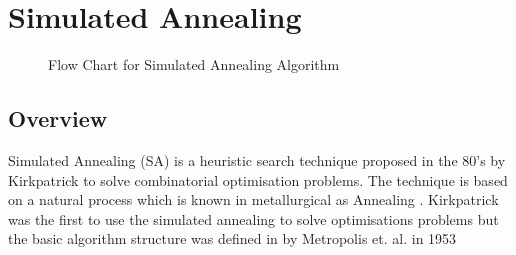 \section{Simulated Annealing}
\begin{figure}[htbp!]
	\begin{center}
	\caption{Flow Chart for Simulated Annealing Algorithm}
	\label{fig:SimulatedAnnealingFlowChart}
	\end{center}
\end{figure}
\subsection{Overview}
\label{sec:SAOverview}
Simulated Annealing (SA) is a heuristic search technique proposed in the 80's by Kirkpatrick to solve combinatorial optimisation problems. The technique is based on a natural process which is known in metallurgical as Annealing \cite{CurveFittingSA,SASingleMultiObj,TempCyclingSA,ChaosSA}. Kirkpatrick was the first to use the simulated annealing to solve optimisations problems but the basic algorithm structure was defined in by Metropolis et. al. in 1953 \cite{CurveFittingSA,VeryFastSAImageEnchancement}

